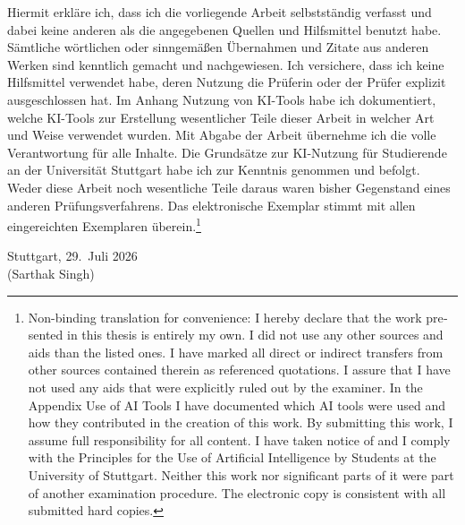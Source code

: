 \documentclass[12pt,leqno,a4paper]{report}
\begin{document}
\noindent Hiermit erkl\"are ich, dass ich die vorliegende Arbeit selbstst\"andig verfasst und dabei keine anderen als die angegebenen Quellen und Hilfsmittel benutzt habe. S\"amtliche w\"ortlichen oder sinngem\"a\ss{}en \"Ubernahmen und Zitate aus anderen Werken sind kenntlich gemacht und nachgewiesen. Ich versichere, dass ich keine Hilfsmittel verwendet habe, deren Nutzung die Pr\"uferin oder der Pr\"ufer explizit ausgeschlossen hat. Im Anhang \glqq Nutzung von KI-Tools\grqq{} habe ich dokumentiert, welche KI-Tools zur Erstellung wesentlicher Teile dieser Arbeit in welcher Art und Weise verwendet wurden. Mit Abgabe der Arbeit \"ubernehme ich die volle Verantwortung f\"ur alle Inhalte. Die Grunds\"atze zur KI-Nutzung f\"ur Studierende an der Universit\"at Stuttgart habe ich zur Kenntnis genommen und befolgt. Weder diese Arbeit noch wesentliche Teile daraus waren bisher Gegenstand eines anderen Pr\"ufungsverfahrens. Das elektronische Exemplar stimmt mit allen eingereichten Exemplaren \"uberein.\footnote{\foreignlanguage{english}{Non-binding translation for convenience: I hereby declare that the work presented in this thesis is entirely my own. I did not use any other sources and aids than the listed ones. I have marked all direct or indirect transfers from other sources contained therein as referenced quotations. I assure that I have not used any aids that were explicitly ruled out by the examiner. In the Appendix \glqq Use of AI Tools\grqq{} I have documented which AI tools were used and how they contributed in the creation of this work. By submitting this work, I assume full responsibility for all content. I have taken notice of and I comply with the Principles for the Use of Artificial Intelligence by Students at the University of Stuttgart. Neither this work nor significant parts of it were part of another examination procedure. The electronic copy is consistent with all submitted hard copies.}}\\[2cm]

\noindent Stuttgart, 29.~Juli 2026\\[1.5cm] %
\noindent (Sarthak Singh)
\clearpage



\setcounter{page}{1}
\tableofcontents
\clearpage
\listoffigures
\clearpage
\listoftables
\clearpage
\end{document}

